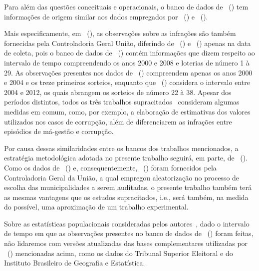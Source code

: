 \documentclass[
	12pt,				%
	openright,			%
	twoside,			%
	a4paper,			%
	openany,
	english,			%
	brazil				%
	]{abntex2}
\begin{document}
Para além das questões conceituais e operacionais, o banco de dados de ~(\citeyear{Brollo2013Aug}) tem informações de origem similar aos dados empregados por ~(\citeyear{ferraz2008exposing}) e ~(\citeyear{Avis2018Oct}).

Mais especificamente, em ~(\citeyear{Brollo2013Aug}), as observações sobre as infrações são também fornecidas pela Controladoria Geral União, diferindo de ~(\citeyear{ferraz2008exposing}) e ~(\citeyear{Avis2018Oct}) apenas na data de coleta, pois o banco de dados de ~(\citeyear{Brollo2013Aug}) contém informações que dizem respeito ao intervalo de tempo compreendendo os anos 2000 e 2008 e loterias de número 1 à 29. As observações presentes nos dados de ~(\citeyear{ferraz2008exposing}) compreendem apenas os anos 2000 e 2004 e os treze primeiros sorteios, enquanto que ~(\citeyear{Avis2018Oct}) considera o intervalo entre 2004 e 2012, os quais abrangem os sorteios de número 22 à 38. Apesar dos períodos distintos, todos os três trabalhos supracitados~\cite{Brollo2013Aug, ferraz2008exposing, Avis2018Oct} consideram algumas medidas em comum, como, por exemplo, a elaboração de estimativas dos valores utilizados nos casos de corrupção, além de diferenciarem as infrações entre episódios de má-gestão e corrupção.

Por causa dessas similaridades entre os bancos dos trabalhos mencionados, a estratégia metodológica adotada no presente trabalho seguirá, em parte, de ~(\citeyear{ferraz2008exposing}). Como os dados de ~(\citeyear{ferraz2008exposing}) e, consequentemente, ~(\citeyear{Brollo2013Aug}) foram fornecidos pela Controladoria Geral da União, a qual empregou aleatorização no processo de escolha das municipalidades a serem auditadas, o presente trabalho também terá as mesmas vantagens que os estudos supracitados, i.e., será também, na medida do possível, uma aproximação de um trabalho experimental.

Sobre as estatísticas populacionais consideradas pelos autores~\cite{Brollo2013Aug, ferraz2008exposing}, dado o intervalo de tempo em que as observações presentes no banco de dados de ~(\citeyear{Brollo2013Aug}) foram feitas, não lidaremos com versões atualizadas das bases complementares utilizadas por ~(\citeyear{ferraz2008exposing}) mencionadas acima, como os dados do Tribunal Superior Eleitoral e do Instituto Brasileiro de Geografia e Estatística.
\end{document}
